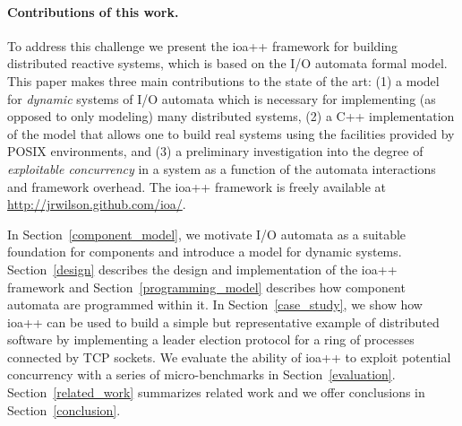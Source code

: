 \paragraph*{Contributions of this work.}
To address this challenge we present the ioa++ framework for building distributed reactive systems, which is based on the I/O automata formal model. 
This paper makes three main contributions to the state of the art:
(1)  a model for \emph{dynamic} systems of I/O automata which is necessary for implementing (as opposed to only modeling) many distributed systems,
(2)  a C++ implementation of the model that allows one to build real systems using the facilities provided by POSIX environments, and
(3)  a preliminary investigation into the degree of \emph{exploitable concurrency} in a system as a function of the automata interactions and framework overhead.
The ioa++ framework is freely available at \url{http://jrwilson.github.com/ioa/}.

In Section~\ref{component_model}, we motivate I/O automata as a suitable foundation for components and introduce a model for dynamic systems.
Section~\ref{design} describes the design and implementation of the ioa++ framework and Section~\ref{programming_model} describes how component automata are programmed within it.
In Section~\ref{case_study}, we show how ioa++ can be used to build a simple but representative example of distributed software by implementing a leader election protocol for a ring of processes connected by TCP sockets.
We evaluate the ability of ioa++ to exploit potential concurrency with a series of micro-benchmarks in Section~\ref{evaluation}.
Section~\ref{related_work} summarizes related work and we offer conclusions in Section~\ref{conclusion}.

